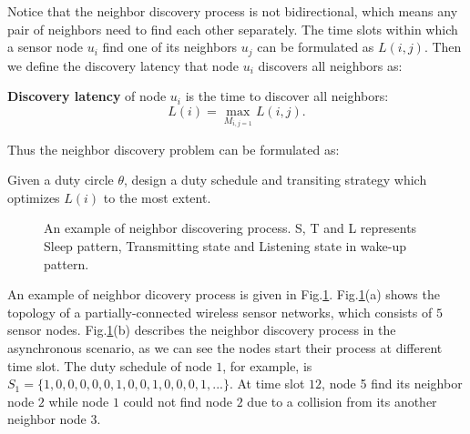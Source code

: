 Notice that the neighbor discovery process is not bidirectional, which means any pair of neighbors 
need to find each other separately. The time slots within which a sensor node $u_i$ find one of its neighbors $u_j$ can be formulated 
as $L(i,j)$. Then we define the discovery latency that node $u_i$ discovers all neighbors as:

\begin{definition}
\textbf{Discovery latency} of node $u_i$ is the time to discover all neighbors:
$$L(i) = \max_{M_{i,j = 1}} L (i,j).
$$
\end{definition}

Thus the neighbor discovery problem can be formulated as:
\begin{problem}
Given a duty circle $\theta$, design a duty schedule and transiting strategy which optimizes $L(i)$ to the most extent. 
\end{problem}

\begin{figure}[!t]
\centering
{}
\vspace{0.03in}
\caption{An example of neighbor discovering process. S, T and L represents Sleep pattern, 
Transmitting state and Listening state in wake-up pattern.}
\label{NDexample}
\end{figure}

An example of neighbor dicovery process is given in Fig.\ref{NDexample}. 
Fig.\ref{NDexample}(a) shows the topology of a partially-connected 
wireless sensor networks, which consists of $5$ sensor nodes. 
Fig.\ref{NDexample}(b) describes the neighbor discovery process 
in the asynchronous scenario, as we can see the nodes 
start their process at different time slot. The duty schedule of 
node $1$, for example, is $S_1=\{1,0,0,0,0,0,1,0,0,1,0,0,0,1,...\}$.  
At time slot $12$, node 5 find its neighbor node $2$ while node $1$ 
could not find node $2$ due to a collision from its another neighbor node $3$. 



